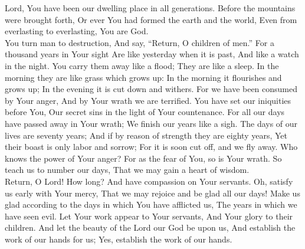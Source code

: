 
Lord, You have been our dwelling place in all generations. Before the mountains were brought forth, Or ever You had formed the earth and the world, Even from everlasting to everlasting, You are God.\\

\noindent
You turn man to destruction, And say, ``Return, O children of men.'' For a thousand years in Your sight Are like yesterday when it is past, And like a watch in the night. You carry them away like a flood; They are like a sleep. In the morning they are like grass which grows up: In the morning it flourishes and grows up; In the evening it is cut down and withers. For we have been consumed by Your anger, And by Your wrath we are terrified. You have set our iniquities before You, Our secret sins in the light of Your countenance. For all our days have passed away in Your wrath; We finish our years like a sigh. The days of our lives are seventy years; And if by reason of strength they are eighty years, Yet their boast is only labor and sorrow; For it is soon cut off, and we fly away. Who knows the power of Your anger? For as the fear of You, so is Your wrath. So teach us to number our days, That we may gain a heart of wisdom.\\

\noindent
Return, O Lord! How long? And have compassion on Your servants. Oh, satisfy us early with Your mercy, That we may rejoice and be glad all our days! Make us glad according to the days in which You have afflicted us, The years in which we have seen evil. Let Your work appear to Your servants, And Your glory to their children. And let the beauty of the Lord our God be upon us, And establish the work of our hands for us; Yes, establish the work of our hands.
